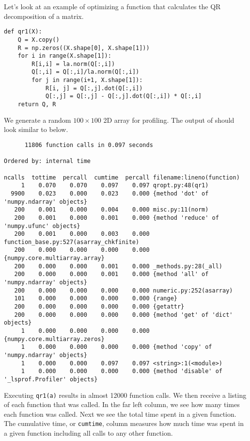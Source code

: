 Let's look at an example of optimizing a function that calculates the QR decomposition of a matrix.
\begin{lstlisting}
def qr1(X):
    Q = X.copy()
    R = np.zeros((X.shape[0], X.shape[1]))
    for i in range(X.shape[1]):
        R[i,i] = la.norm(Q[:,i])
        Q[:,i] = Q[:,i]/la.norm(Q[:,i])
        for j in range(i+1, X.shape[1]):
            R[i, j] = Q[:,j].dot(Q[:,i])
            Q[:,j] = Q[:,j] - Q[:,j].dot(Q[:,i]) * Q[:,i]
    return Q, R
\end{lstlisting}
We generate a random $100 \times 100$ 2D array for profiling.  The output of  should look similar to below.
{\scriptsize
\begin{verbatim}
      11806 function calls in 0.097 seconds

Ordered by: internal time

ncalls  tottime  percall  cumtime  percall filename:lineno(function)
     1    0.070    0.070    0.097    0.097 qropt.py:48(qr1)
  9900    0.023    0.000    0.023    0.000 {method 'dot' of 'numpy.ndarray' objects}
   200    0.001    0.000    0.004    0.000 misc.py:11(norm)
   200    0.001    0.000    0.001    0.000 {method 'reduce' of 'numpy.ufunc' objects}
   200    0.001    0.000    0.003    0.000 function_base.py:527(asarray_chkfinite)
   200    0.000    0.000    0.000    0.000 {numpy.core.multiarray.array}
   200    0.000    0.000    0.001    0.000 _methods.py:28(_all)
   200    0.000    0.000    0.001    0.000 {method 'all' of 'numpy.ndarray' objects}
   200    0.000    0.000    0.000    0.000 numeric.py:252(asarray)
   101    0.000    0.000    0.000    0.000 {range}
   200    0.000    0.000    0.000    0.000 {getattr}
   200    0.000    0.000    0.000    0.000 {method 'get' of 'dict' objects}
     1    0.000    0.000    0.000    0.000 {numpy.core.multiarray.zeros}
     1    0.000    0.000    0.000    0.000 {method 'copy' of 'numpy.ndarray' objects}
     1    0.000    0.000    0.097    0.097 <string>:1(<module>)
     1    0.000    0.000    0.000    0.000 {method 'disable' of '_lsprof.Profiler' objects}
\end{verbatim}
}
Executing \texttt{qr1(a)} results in almost 12000 function calls.  
We then receive a listing of each function that was called.  In the far left column, we see how many times each function was called.
Next we see the total time spent in a given function.
The cumulative time, or \texttt{cumtime}, column measures how much time was spent in a given function including all calls to any other function.

